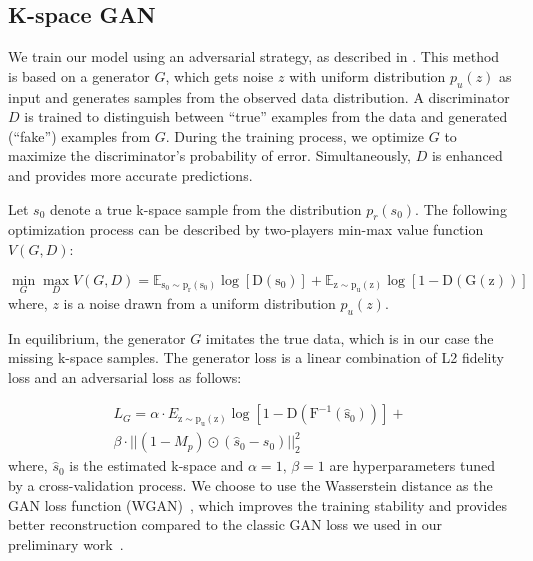 \documentclass[review]{elsarticle}
\begin{document}
\subsection{K-space GAN}
We train our model using an adversarial strategy, as described in \cite{goodfellow2014generative,radford2015unsupervised}. 
This method is based on a generator $G$, which gets noise \textbf{$z$ }with uniform distribution \textbf{$p_{u}\left(z\right)$} as input and generates samples from the observed data distribution. A discriminator $D$ is trained to distinguish between ``true'' examples from the data and generated (``fake'') examples from $G.$ During the training process, we optimize $G$ to maximize the discriminator's probability of error. Simultaneously, $D$ is enhanced and provides more accurate predictions.

Let $s_{0}$ denote a true k-space sample from the distribution $p_{r}\left(s_{0}\right)$. The following optimization process can be described by two-players min-max value function $V(G,D)$:

\begin{equation}
\min_{G}\max_{D}V(G,D) = \mathbb{E_{\mathrm{s_{0}\sim p_{r}\left(s_{0}\right)}}\mathrm{\log\left[D\left(s_{0}\right)\right]}}+\mathbb{E_{\mathrm{z\sim p_{u}\left(z\right)}}\mathrm{\log\left[1-D\left(G(z)\right)\right]}}
\end{equation}
where, $z$ is a noise drawn from a uniform distribution $p_{u}\left(z\right)$.

In equilibrium, the generator $G$ imitates the true data, which is in our case the missing k-space samples. The generator loss is a linear combination of L2 fidelity loss and an adversarial loss as follows:

\begin{equation}
\begin{aligned}L_{G}=\alpha\cdot E_{\mathrm{z\sim p_{u}\left(z\right)}}\mathrm{\log\left[1-D\left(F^{-1}\left(\hat{s}_{0}\right)\right)\right]}+\\
\beta\cdot||\left(1-M_{p}\right)\odot\left(\hat{s}_{0}-s_{0}\right)||_{2}^{2}
\end{aligned}
\end{equation}
where, $\hat{s}_{0}$ is the estimated k-space and $\alpha=1,\,\beta=1$ are hyperparameters tuned by a cross-validation process.
We choose to use the Wasserstein distance as the GAN loss function (WGAN)~\cite{arjovsky2017wasserstein}, which improves the training stability and provides better reconstruction compared to the classic GAN loss we used in our preliminary work~\cite{shitrit2017accelerated}.
\end{document}
